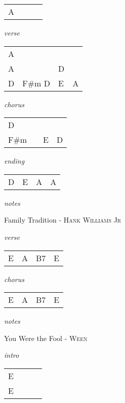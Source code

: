 \documentclass[12pt]{article}
\begin{document}
\begin{tabular}{|P{1.25in}|P{1.25in}|P{1.25in}|P{1.25in}|}
  A &  &  &  \\
\end{tabular}

\textit{verse}

\begin{tabular}{|P{1.25in}|P{1.25in}|P{1.25in}|P{1.25in}|}
  A &  &  &  \\
  A &  &  D  \\
  D & F\#m D & E & A \\
\end{tabular}

\textit{chorus}

\begin{tabular}{|P{1.25in}|P{1.25in}|P{1.25in}|P{1.25in}|}
  D &   &   &   \\
  F\#m &   &  E  &  D \\
\end{tabular}

\textit{ending}

\begin{tabular}{|P{1.25in}|P{1.25in}|P{1.25in}|P{1.25in}|}
  D & E & A & A \\
\end{tabular}

\textit{notes}



\newpage
{\Huge Family Tradition} {\huge - \textsc{Hank Williams Jr}}

\huge
\textit{verse}

\begin{tabular}{|P{1.25in}|P{1.25in}|P{1.25in}|P{1.25in}|}
  E  &  A & B7  & E  \\
\end{tabular}

\textit{chorus}

\begin{tabular}{|P{1.25in}|P{1.25in}|P{1.25in}|P{1.25in}|}
   E &  A &  B7 & E  \\
\end{tabular}

\textit{notes}

\newpage

{\Huge You Were the Fool} {\huge - \textsc{Ween}}

\huge
\textit{intro}

\begin{tabular}{|P{1.25in}|P{1.25in}|P{1.25in}|P{1.25in}|}
  E &   &   &   \\
  E &   &   &   \\
\end{tabular}
\end{document}
